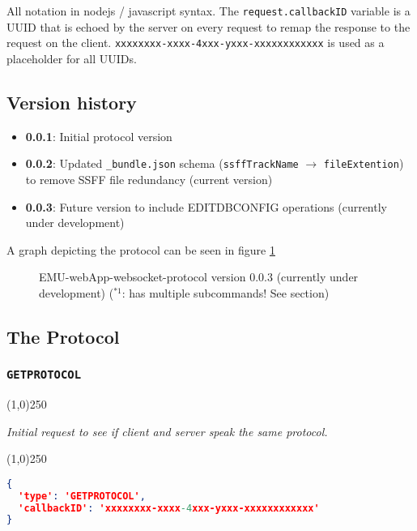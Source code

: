 \documentclass[A4,12pt, utf8]{article}
\begin{document}
All notation in nodejs / javascript syntax. The \texttt{request.callbackID} variable is a UUID that is echoed by the server on every request to remap the response to the request on the client. \texttt{xxxxxxxx-xxxx-4xxx-yxxx-xxxxxxxxxxxx} is used as a placeholder for all UUIDs.

\subsection{Version history}
\begin{itemize}
  \item \textbf{0.0.1}: Initial protocol version
  \item \textbf{0.0.2}: Updated \texttt{\_bundle.json} schema (\texttt{ssffTrackName} $\rightarrow$ \texttt{fileExtention}) to remove SSFF file redundancy (current version)
  \item \textbf{0.0.3}: Future version to include EDITDBCONFIG operations (currently under development)
\end{itemize}


A graph depicting the protocol can be seen in figure \ref{fig:emuwsprot}

\begin{figure}[!ht]
\caption{EMU-webApp-websocket-protocol version 0.0.3 (currently under development) ($^{*1}$: has multiple subcommands! See section)}\label{fig:emuwsprot}
\begin{center}

\end{center}
\end{figure}

\subsection{The Protocol}

\subsubsection{\texttt{GETPROTOCOL}}
\begin{center}
  \line(1,0){250}

  \textit{Initial request to see if client and server speak the same protocol.}

  \line(1,0){250}
\end{center}


\begin{lstlisting}[caption=Request content, language=json]
{
  'type': 'GETPROTOCOL', 
  'callbackID': 'xxxxxxxx-xxxx-4xxx-yxxx-xxxxxxxxxxxx'
}
\end{lstlisting}
\end{document}

